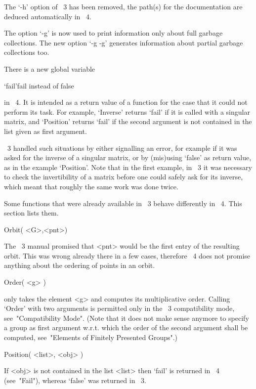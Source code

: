 The `-h' option of {\GAP}~3 has been removed,
the path(s) for the documentation are deduced automatically in {\GAP}~4.

The option `-g' is now used to print information only about full garbage
collections.
The new option `-g -g' generates  information about partial
garbage collections too.



There is a new global variable

\>`fail'{fail instead of false}

in {\GAP}~4.
It is intended as a return value of a function for the case that it
could not perform its task.
For example, `Inverse' returns `fail' if it is called with a singular
matrix, and `Position' returns `fail' if the second argument is not
contained in the list given as first argument.

{\GAP}~3 handled such situations by either signalling an error,
for example if it was asked for the inverse of a singular matrix,
or by (mis)using `false' as return value, as in the example `Position'.
Note that in the first example, in {\GAP}~3 it was necessary to check
the invertibility of a matrix before one could safely ask for its
inverse, which meant that roughly the same work was done twice.



Some functions that were already available in {\GAP}~3  behave
differently in {\GAP}~4.  This section lists them.

\>Orbit( <G>,<pnt>)

The {\GAP}~3 manual promised that <pnt> would be the first entry of the
resulting orbit. This was wrong already there in a few cases, therefore
{\GAP}~4 does not promise anything about the ordering of points in an orbit.

\>Order( <g> )

only takes the element <g> and computes its multiplicative order.
Calling `Order' with two arguments is permitted only in the
{\GAP}~3 compatibility mode, see~"Compatibility Mode".
(Note that it does not make sense anymore to specify a group as
first argument w.r.t. which the order of the second argument shall
be computed, see~"Elements of Finitely Presented Groups".)

\>Position( <list>, <obj> )

If <obj> is not contained in the list <list> then `fail' is returned
in {\GAP}~4 (see~"Fail"), whereas `false' was returned in {\GAP}~3.


